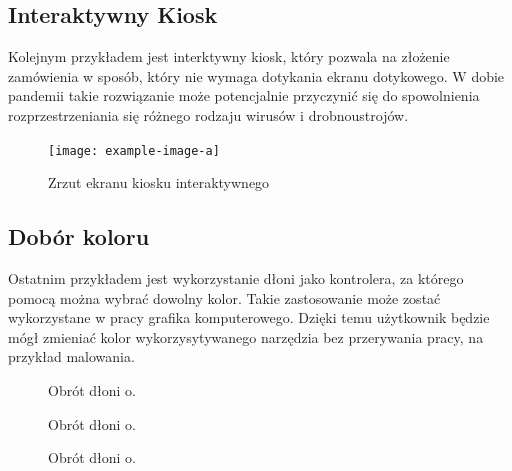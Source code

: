 \subsection{Interaktywny Kiosk}
\quad Kolejnym przykładem jest interktywny kiosk, który pozwala na złożenie zamówienia w sposób, który nie wymaga dotykania ekranu dotykowego. W dobie pandemii takie rozwiązanie może potencjalnie przyczynić się do spowolnienia rozprzestrzeniania się różnego rodzaju wirusów i drobnoustrojów. 


\begin{figure}[H]
    \begin{center}
        \texttt{[image: example-image-a]}
        \caption{Zrzut ekranu kiosku interaktywnego}
    \end{center}
\end{figure}

\subsection{Dobór koloru}
\quad Ostatnim przykładem jest wykorzystanie dłoni jako kontrolera, za którego pomocą można wybrać dowolny kolor. Takie zastosowanie może zostać wykorzystane w pracy grafika komputerowego. Dzięki temu użytkownik będzie mógł zmieniać kolor wykorzysytywanego narzędzia bez przerywania pracy, na przykład malowania. 


\begin{figure}[H]
    \centering
    \hfill
    \caption{Obrót dłoni o.}
\end{figure}

\begin{figure}[H]
    \centering
    \hfill
    \caption{Obrót dłoni o.}
\end{figure}

\begin{figure}[H]
    \centering
    \hfill
    \caption{Obrót dłoni o.}
\end{figure}